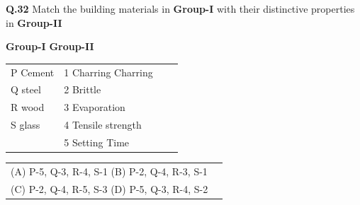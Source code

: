 \documentclass{article}
\begin{document}
\vspace{0.5cm}

\textbf{Q.32} Match the building materials in \textbf{Group-I} with their distinctive properties in \textbf{Group-II}

\vspace{4pt}

\vspace{4pt}

\hspace{3cm}  \textbf{Group-I}\hspace{8cm} \textbf{Group-II} \\
\vspace{0.15cm}
\begin{tabular}{llcl}
\vspace{0.15cm}

\hspace{2cm} P \hspace{0.3cm}  Cement    &\hspace{7Cm} 1 Charring Charring\hspace{0.3cm}    \\
\vspace{0.15cm}
\hspace{2cm} Q  \hspace{0.3cm} steel      &\hspace{7cm} 2 Brittle \hspace{0.3cm}               \\
\vspace{0.15cm}
    \hspace{2cm} R  \hspace{0.3cm} wood      &\hspace{7cm} 3      Evaporation   \hspace{0.3cm }\\
    \vspace{0.15cm}
    \hspace{2cm}  S  \hspace{0.3cm}   glass   &\hspace{7cm} 4 Tensile strength \\
                       &\hspace{7cm}  5  Setting Time

    
\end{tabular}
\vspace{0.15cm}

 \bigskip
 
\begin{tabular}{ll}
\hspace{2cm}(A)  P-5, Q-3, R-4, S-1
\hspace{4cm}(B)  P-2, Q-4, R-3, S-1 \\  \vspace{0.5cm}
\hspace{2cm}(C)  P-2, Q-4, R-5, S-3 
\hspace{4cm}(D)  P-5, Q-3, R-4, S-2 
\end{tabular}
\end{document}
